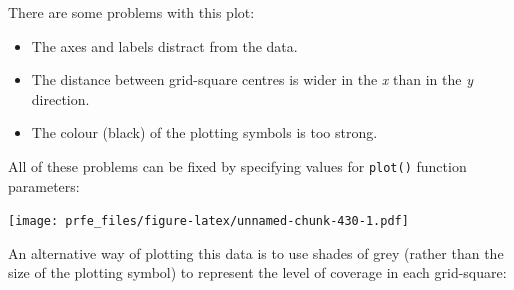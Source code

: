 \documentclass[12pt,a4paper]{book}
\newenvironment{Shaded}{\begin{snugshade}}{\end{snugshade}}
\newcommand{\KeywordTok}[1]{\textcolor[rgb]{0.13,0.29,0.53}{\textbf{#1}}}
\newcommand{\DataTypeTok}[1]{\textcolor[rgb]{0.13,0.29,0.53}{#1}}
\newcommand{\DecValTok}[1]{\textcolor[rgb]{0.00,0.00,0.81}{#1}}
\newcommand{\FloatTok}[1]{\textcolor[rgb]{0.00,0.00,0.81}{#1}}
\newcommand{\StringTok}[1]{\textcolor[rgb]{0.31,0.60,0.02}{#1}}
\newcommand{\OtherTok}[1]{\textcolor[rgb]{0.56,0.35,0.01}{#1}}
\newcommand{\OperatorTok}[1]{\textcolor[rgb]{0.81,0.36,0.00}{\textbf{#1}}}
\newcommand{\NormalTok}[1]{#1}
\theoremstyle{definition}
\theoremstyle{definition}
\theoremstyle{definition}
\theoremstyle{remark}
\begin{document}
There are some problems with this plot:

\begin{itemize}
\item
  The axes and labels distract from the data.
\item
  The distance between grid-square centres is wider in the \emph{x} than
  in the \emph{y} direction.
\item
  The colour (black) of the plotting symbols is too strong.
\end{itemize}

All of these problems can be fixed by specifying values for
\texttt{plot()} function parameters:

\begin{Shaded}
\end{Shaded}

\texttt{[image: prfe\_files/figure-latex/unnamed-chunk-430-1.pdf]}

An alternative way of plotting this data is to use shades of grey
(rather than the size of the plotting symbol) to represent the level of
coverage in each grid-square:

\begin{Shaded}
\end{Shaded}
\end{document}
